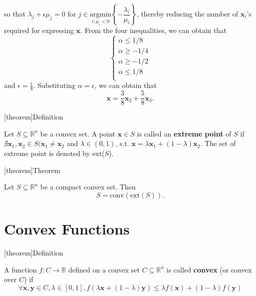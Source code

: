 \documentclass[12pt]{report}
\theoremstyle{definition}
\begin{document}
\begin{caratheodory example}
\[    \]
    so that $\lambda_j+\epsilon\mu_j=0$ for
    $j\in\underset{i:\mu_i<0}{\text{argmin}}\left\{-\dfrac{\lambda_i}{\mu_i}\right\}$,
    thereby reducing the number of $\mathbf{x}_i$'s required for expressing
    $\mathbf{x}$. From the four inequalities, we can obtain that
    \[
        \begin{cases}
            \alpha\le 1/8 \\
            \alpha\ge -1/4 \\
            \alpha\ge -1/2 \\
            \alpha\le 1/8 \\
        \end{cases} 
    \]
    and $\epsilon=\frac{1}{8}$. Substituting $\alpha=\epsilon$, we can obtain
    that
    \[
        \mathbf{x}=\frac{3}{8}\mathbf{x}_2+\frac{5}{8}\mathbf{x}_3.
    \]
\end{caratheodory example}


[theorem]{Definition}
\begin{extreme points}
    Let $S\subseteq\mathbb{R}^{n}$ be a convex set. A point $\mathbf{x}\in S$ is
    called an \textbf{extreme point} of $S$ if
    $\nexists\mathbf{x}_1,\mathbf{x}_2\in S(\mathbf{x}_1\neq\mathbf{x}_2$
    and $\lambda\in(0,1)$, s.t.
    $\mathbf{x}=\lambda\mathbf{x}_1+(1-\lambda)\mathbf{x}_2$.
    The set of extreme point is denoted by ext($S$).
\end{extreme points}

[theorem]{Theorem}
\begin{krein-milman}
    Let $S\subseteq\mathbb{R}^{n}$ be a compact convex set.
    Then
    \[
        S=\text{conv}(\text{ext}(S)).
    \]
\end{krein-milman}

\section{Convex Functions}

[theorem]{Definition}
\begin{convex function}
    A function $f:C\rightarrow\mathbb{R}$ defined on a convex set
    $C\subseteq\mathbb{R}^{n}$ is called \textbf{convex} (or convex over $C$) if
    \[
        \forall\mathbf{x},\mathbf{y}\in C,\lambda\in[0,1],
        f(\lambda\mathbf{x}+(1-\lambda)\mathbf{y})\le
        \lambda f(\mathbf{x})+(1-\lambda)f(\mathbf{y})
    \]
\end{convex function}
\end{document}
